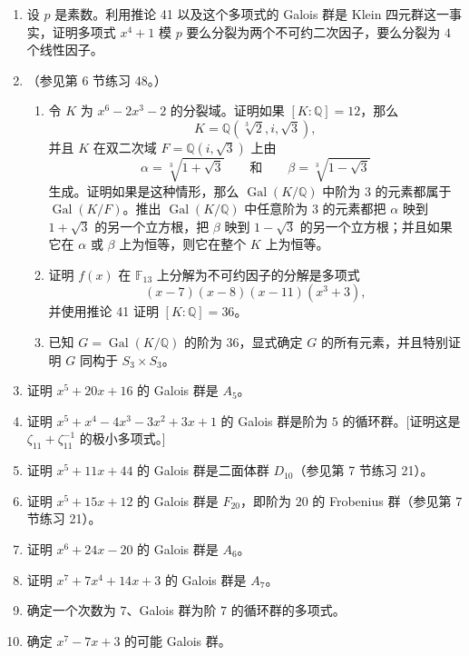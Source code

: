 \begin{enumerate}
\item 设 $p$ 是素数。利用推论 41 以及这个多项式的 Galois 群是 Klein 四元群这一事实，证明多项式 $x^4+1$ 模 $p$ 要么分裂为两个不可约二次因子，要么分裂为 $4$ 个线性因子。

\item （参见第 6 节练习 48。）
\begin{enumerate}
\item 令 $K$ 为 $x^6-2x^3-2$ 的分裂域。证明如果 $[K:\mathbb Q]=12$，那么
\[
K=\mathbb Q(\sqrt[3]{2},i,\sqrt3),
\]
并且 $K$ 在双二次域 $F=\mathbb Q(i,\sqrt3)$ 上由
\[
\alpha=\sqrt[3]{1+\sqrt3}
\qquad\text{和}\qquad
\beta=\sqrt[3]{1-\sqrt3}
\]
生成。证明如果是这种情形，那么 $\operatorname{Gal}(K/\mathbb Q)$ 中阶为 $3$ 的元素都属于 $\operatorname{Gal}(K/F)$。推出 $\operatorname{Gal}(K/\mathbb Q)$ 中任意阶为 $3$ 的元素都把 $\alpha$ 映到 $1+\sqrt3$ 的另一个立方根，把 $\beta$ 映到 $1-\sqrt3$ 的另一个立方根；并且如果它在 $\alpha$ 或 $\beta$ 上为恒等，则它在整个 $K$ 上为恒等。

\item 证明 $f(x)$ 在 $\mathbb F_{13}$ 上分解为不可约因子的分解是多项式
\[
(x-7)(x-8)(x-11)(x^3+3),
\]
并使用推论 41 证明 $[K:\mathbb Q]=36$。

\item 已知 $G=\operatorname{Gal}(K/\mathbb Q)$ 的阶为 $36$，显式确定 $G$ 的所有元素，并且特别证明 $G$ 同构于 $S_3\times S_3$。
\end{enumerate}

\item 证明 $x^5+20x+16$ 的 Galois 群是 $A_5$。

\item 证明 $x^5+x^4-4x^3-3x^2+3x+1$ 的 Galois 群是阶为 $5$ 的循环群。[证明这是 $\zeta_{11}+\zeta_{11}^{-1}$ 的极小多项式。]

\item 证明 $x^5+11x+44$ 的 Galois 群是二面体群 $D_{10}$（参见第 7 节练习 21）。

\item 证明 $x^5+15x+12$ 的 Galois 群是 $F_{20}$，即阶为 $20$ 的 Frobenius 群（参见第 7 节练习 21）。

\item 证明 $x^6+24x-20$ 的 Galois 群是 $A_6$。

\item 证明 $x^7+7x^4+14x+3$ 的 Galois 群是 $A_7$。

\item 确定一个次数为 $7$、Galois 群为阶 $7$ 的循环群的多项式。

\item 确定 $x^7-7x+3$ 的可能 Galois 群。
\end{enumerate}

